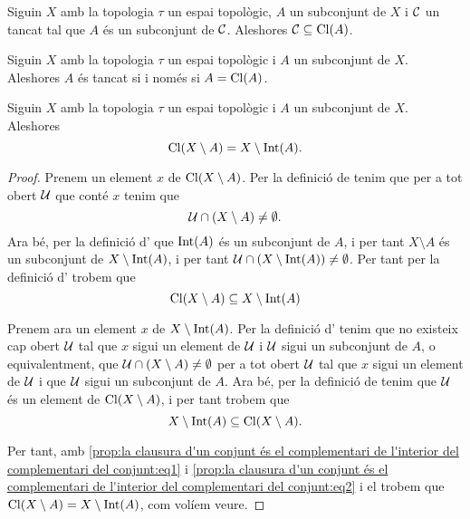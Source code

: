 \documentclass[../Apunts.tex]{subfiles}
\begin{document}
	\begin{corollary}
		\label{cor:la clausura d'un conjunt és el tancat més petit que el conté}
		Siguin \(X\) amb la topologia \(\tau\) un espai topològic, \(A\) un subconjunt de \(X\) i \(\mathcal{C}\) un tancat tal que \(A\) és un subconjunt de \(\mathcal{C}\). Aleshores \(\mathcal{C}\subseteq\operatorname{Cl}(A)\).
	\end{corollary}
	\begin{corollary}
		\label{cor:un conjunt és tancat si i només si és igual a la seva clausura}
		Siguin \(X\) amb la topologia \(\tau\) un espai topològic i \(A\) un subconjunt de \(X\). Aleshores \(A\) és tancat si i només si \(A=\operatorname{Cl}(A)\).
	\end{corollary}
	\begin{proposition}
		\label{prop:la clausura d'un conjunt és el complementari de l'interior del complementari del conjunt}
		Siguin \(X\) amb la topologia \(\tau\) un espai topològic i \(A\) un subconjunt de \(X\). Aleshores
		\[\operatorname{Cl}(X\setminus A)=X\setminus\operatorname{Int}(A).\]
		\begin{proof}
			Prenem un element \(x\) de \(\operatorname{Cl}(X\setminus A)\). Per la definició de  tenim que per a tot obert \(\mathcal{U}\) que conté \(x\) tenim que
			\[\mathcal{U}\cap(X\setminus A)\neq\emptyset.\]
			Ara bé, per la definició d' que \(\operatorname{Int}(A)\) és un subconjunt de \(A\), i per tant \(X\setminus A\) és un subconjunt de \(X\setminus\operatorname{Int}(A)\), i per tant \(\mathcal{U}\cap(X\setminus\operatorname{Int}(A))\neq\emptyset\). Per tant per la definició d' trobem que
			\begin{equation}
				\label{prop:la clausura d'un conjunt és el complementari de l'interior del complementari del conjunt:eq1}
				\operatorname{Cl}(X\setminus A)\subseteq X\setminus\operatorname{Int}(A)
			\end{equation}
			
			Prenem ara un element \(x\) de \(X\setminus\operatorname{Int}(A)\). Per la definició d' tenim que no existeix cap obert \(\mathcal{U}\) tal que \(x\) sigui un element de \(\mathcal{U}\) i \(\mathcal{U}\) sigui un subconjunt de \(A\), o equivalentment, que \(\mathcal{U}\cap(X\setminus A)\neq\emptyset\) per a tot obert \(\mathcal{U}\) tal que \(x\) sigui un element de  \(\mathcal{U}\) i que \(\mathcal{U}\) sigui un subconjunt de \(A\). Ara bé, per la definició de  tenim que \(\mathcal{U}\) és un element de \(\operatorname{Cl}(X\setminus A)\), i per tant trobem que
			\begin{equation}
				\label{prop:la clausura d'un conjunt és el complementari de l'interior del complementari del conjunt:eq2}
				X\setminus\operatorname{Int}(A)\subseteq\operatorname{Cl}(X\setminus A).
			\end{equation}
			
			Per tant, amb \eqref{prop:la clausura d'un conjunt és el complementari de l'interior del complementari del conjunt:eq1} i \eqref{prop:la clausura d'un conjunt és el complementari de l'interior del complementari del conjunt:eq2} i el  trobem que \(\operatorname{Cl}(X\setminus A)=X\setminus\operatorname{Int}(A)\), com volíem veure.
		\end{proof}
	\end{proposition}
\end{document}
